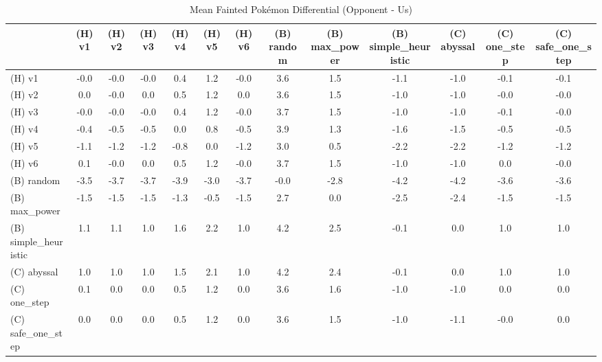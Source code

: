 \begin{table}[htbp]
\caption{Mean Fainted Pokémon Differential (Opponent - Us)}
\label{tab:fainted_diff}
\begin{tabular}{lcccccccccccc}
\hline
 & (H) v1 & (H) v2 & (H) v3 & (H) v4 & (H) v5 & (H) v6 & (B) random & (B) max\_power & (B) simple\_heuristic & (C) abyssal & (C) one\_step & (C) safe\_one\_step \\
\hline
(H) v1 & -0.0 & -0.0 & -0.0 & 0.4 & 1.2 & -0.0 & 3.6 & 1.5 & -1.1 & -1.0 & -0.1 & -0.1 \\
(H) v2 & 0.0 & -0.0 & 0.0 & 0.5 & 1.2 & 0.0 & 3.6 & 1.5 & -1.0 & -1.0 & -0.0 & -0.0 \\
(H) v3 & -0.0 & -0.0 & -0.0 & 0.4 & 1.2 & -0.0 & 3.7 & 1.5 & -1.0 & -1.0 & -0.1 & -0.0 \\
(H) v4 & -0.4 & -0.5 & -0.5 & 0.0 & 0.8 & -0.5 & 3.9 & 1.3 & -1.6 & -1.5 & -0.5 & -0.5 \\
(H) v5 & -1.1 & -1.2 & -1.2 & -0.8 & 0.0 & -1.2 & 3.0 & 0.5 & -2.2 & -2.2 & -1.2 & -1.2 \\
(H) v6 & 0.1 & -0.0 & 0.0 & 0.5 & 1.2 & -0.0 & 3.7 & 1.5 & -1.0 & -1.0 & 0.0 & -0.0 \\
(B) random & -3.5 & -3.7 & -3.7 & -3.9 & -3.0 & -3.7 & -0.0 & -2.8 & -4.2 & -4.2 & -3.6 & -3.6 \\
(B) max\_power & -1.5 & -1.5 & -1.5 & -1.3 & -0.5 & -1.5 & 2.7 & 0.0 & -2.5 & -2.4 & -1.5 & -1.5 \\
(B) simple\_heuristic & 1.1 & 1.1 & 1.0 & 1.6 & 2.2 & 1.0 & 4.2 & 2.5 & -0.1 & 0.0 & 1.0 & 1.0 \\
(C) abyssal & 1.0 & 1.0 & 1.0 & 1.5 & 2.1 & 1.0 & 4.2 & 2.4 & -0.1 & 0.0 & 1.0 & 1.0 \\
(C) one\_step & 0.1 & 0.0 & 0.0 & 0.5 & 1.2 & 0.0 & 3.6 & 1.6 & -1.0 & -1.0 & 0.0 & 0.0 \\
(C) safe\_one\_step & 0.0 & 0.0 & 0.0 & 0.5 & 1.2 & 0.0 & 3.6 & 1.5 & -1.0 & -1.1 & -0.0 & 0.0 \\
\hline
\end{tabular}
\end{table}
